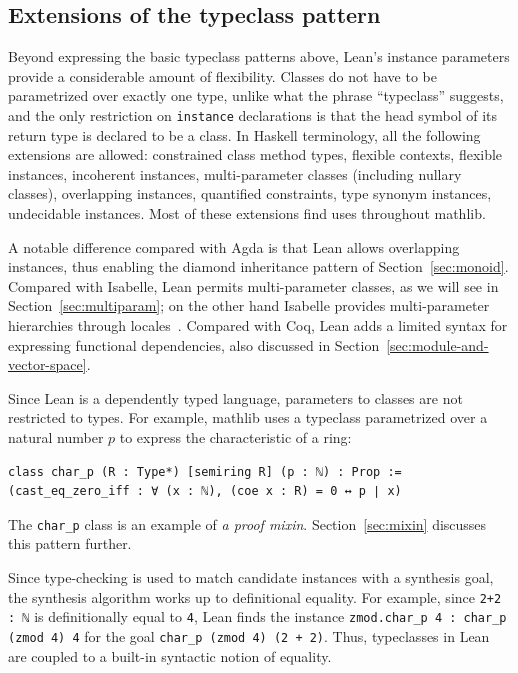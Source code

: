 \documentclass[a4paper,UKenglish,cleveref, autoref, thm-restate]{lipics-v2021}
\newcommand{\mathlib}{\textsf{mathlib}\xspace}
\begin{document}
\subsection{Extensions of the typeclass pattern}

Beyond expressing the basic typeclass patterns above, Lean's instance parameters provide a considerable amount of flexibility.
Classes do not have to be parametrized over exactly one type, unlike what the phrase ``typeclass'' suggests,
and the only restriction on \lstinline{instance} declarations is that the head symbol of its return type is declared to be a class.
In Haskell terminology, all the following extensions are allowed: constrained class method types, flexible contexts, flexible instances, incoherent instances, multi-parameter classes (including nullary classes), overlapping instances, quantified constraints, type synonym instances, undecidable instances.
Most of these extensions find uses throughout \mathlib.

A notable difference compared with Agda is that Lean allows overlapping instances, thus enabling the diamond inheritance pattern of Section~\ref{sec:monoid}.
Compared with Isabelle, Lean permits multi-parameter classes, as we will see in Section~\ref{sec:multiparam}; on the other hand Isabelle provides multi-parameter hierarchies through locales~\cite{ballarin-locales}.
Compared with Coq, Lean adds a limited syntax for expressing functional dependencies, also discussed in Section~\ref{sec:module-and-vector-space}.

Since Lean is a dependently typed language, parameters to classes are not restricted to types.
For example, \mathlib uses a typeclass parametrized over a natural number $p$ to express the characteristic of a ring:
\begin{lstlisting}
class char_p (R : Type*) [semiring R] (p : ℕ) : Prop :=
(cast_eq_zero_iff : ∀ (x : ℕ), (coe x : R) = 0 ↔ p ∣ x)
\end{lstlisting}
The \lstinline{char_p} class is an example of \emph{a proof mixin}.
Section~\ref{sec:mixin} discusses this pattern further.

Since type-checking is used to match candidate instances with a synthesis goal,
the synthesis algorithm works up to definitional equality.
For example, since \lstinline{2+2 : ℕ} is definitionally equal to \lstinline{4},
Lean finds the instance \lstinline{zmod.char_p 4 : char_p (zmod 4) 4} for the goal \lstinline{char_p (zmod 4) (2 + 2)}.
Thus, typeclasses in Lean are coupled to a built-in syntactic notion of equality.
\end{document}
